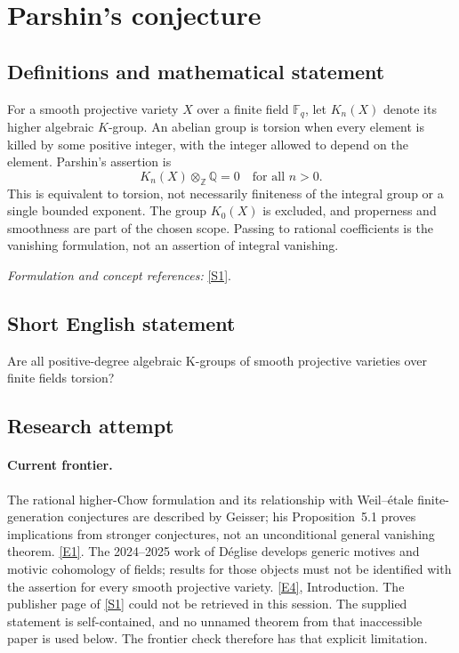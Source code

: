 \documentclass[11pt,a4paper]{article}
\newcommand{\Z}{\mathbb{Z}}
\newcommand{\Q}{\mathbb{Q}}
\newcommand{\F}{\mathbb{F}}
\newcommand{\sref}[2]{\hyperlink{source:#1:#2}{[S#2]}}
\newcommand{\eref}[2]{\hyperlink{extra:#1:#2}{[E#2]}}
\newif\ifshowcatalogue
\newcommand{\cataloguescope}[1]{\ifshowcatalogue
 \paragraph{Exact scope in the supplied catalogue.}
 \begin{quote}\small #1\end{quote}\fi}
\numberwithin{equation}{section}
\begin{document}
\setcounter{section}{0}
\clearpage
\section*{\texorpdfstring{Parshin's conjecture}{Parshin's conjecture}}\label{statement}
\subsection{Definitions and mathematical statement}
For a smooth projective variety $X$ over a finite field $\F_q$, let $K_n(X)$ denote its higher algebraic $K$-group. An abelian group is torsion when every element is killed by some positive integer, with the integer allowed to depend on the element. Parshin's assertion is
\[
 K_n(X)\otimes_{\Z}\Q=0\quad\text{for all }n>0.
\]
This is equivalent to torsion, not necessarily finiteness of the integral group or a single bounded exponent. The group $K_0(X)$ is excluded, and properness and smoothness are part of the chosen scope. Passing to rational coefficients is the vanishing formulation, not an assertion of integral vanishing.
\par\smallskip\textit{Formulation and concept references:} \sref{statement}{1}.
\cataloguescope{Prove that for every smooth projective variety X over a finite field and every integer n greater than zero, the higher algebraic K-group K\_n(X) is torsion.}
\subsection{Short English statement}
Are all positive-degree algebraic K-groups of smooth projective varieties over finite fields torsion?
\subsection{Research attempt}

\paragraph{Current frontier.}
The rational higher-Chow formulation and its relationship with
Weil--\'etale finite-generation conjectures are described by Geisser;
his Proposition~5.1 proves implications from stronger conjectures, not
an unconditional general vanishing theorem. \eref{statement}{1}.
The 2024--2025 work of D\'eglise develops generic motives and motivic
cohomology of fields; results for those objects must not be identified
with the assertion for every smooth projective variety.
\eref{statement}{4}, Introduction. The publisher page of \sref{statement}{1} could
not be retrieved in this session. The supplied statement is
self-contained, and no unnamed theorem from that inaccessible paper is
used below. The frontier check therefore has that explicit limitation.
\end{document}
